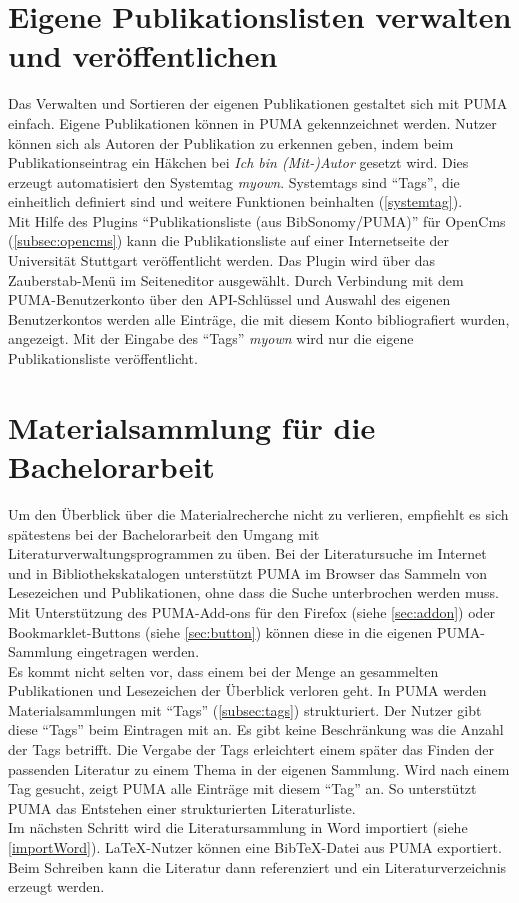 \section{Eigene Publikationslisten verwalten und veröffentlichen}
\label{sec:eigenePublistenVerwalten}
Das Verwalten und Sortieren der eigenen Publikationen gestaltet sich mit PUMA einfach. Eigene  Publikationen können in PUMA gekennzeichnet werden. Nutzer können sich als Autoren der Publikation zu erkennen geben, indem beim Publikationseintrag ein Häkchen bei \textit{Ich bin (Mit-)Autor} gesetzt wird. Dies erzeugt automatisiert den Systemtag \textit{myown}. Systemtags sind \enquote{Tags}, die einheitlich definiert sind und weitere Funktionen beinhalten (\autoref{systemtag}).\\
Mit Hilfe des Plugins \enquote{Publikationsliste (aus BibSonomy/PUMA)} für OpenCms (\autoref{subsec:opencms}) kann die Publikationsliste auf einer Internetseite der Universität Stuttgart veröffentlicht werden. Das Plugin wird über das Zauberstab-Menü im Seiteneditor ausgewählt. Durch Verbindung mit dem PUMA-Benutzerkonto über den API-Schlüssel und Auswahl des eigenen Benutzerkontos werden alle Einträge, die mit diesem Konto bibliografiert wurden, angezeigt. Mit der Eingabe des \enquote{Tags} \textit{myown} wird nur die eigene Publikationsliste veröffentlicht.



\section{Materialsammlung für die Bachelorarbeit}
\label{sec:materialsammlungBachelorarbeit}
Um den Überblick über die Materialrecherche nicht zu verlieren, empfiehlt es sich spätestens bei der Bachelorarbeit den Umgang mit Literaturverwaltungsprogrammen zu üben. Bei der Literatursuche im Internet und in Bibliothekskatalogen unterstützt PUMA im Browser das Sammeln von Lesezeichen und Publikationen, ohne dass die Suche unterbrochen werden muss. Mit Unterstützung des PUMA-Add-ons für den Firefox (siehe \autoref{sec:addon}) oder Bookmarklet-Buttons (siehe \autoref{sec:button}) können diese in die eigenen PUMA-Sammlung eingetragen werden.\\
Es kommt nicht selten vor, dass einem bei der Menge an gesammelten Publikationen und Lesezeichen der Überblick verloren geht. In PUMA werden Materialsammlungen mit \enquote{Tags} (\autoref{subsec:tags}) strukturiert. Der Nutzer gibt diese \enquote{Tags} beim Eintragen mit an. Es gibt keine Beschränkung was die Anzahl der Tags betrifft. Die Vergabe der Tags erleichtert einem später das Finden der passenden Literatur zu einem Thema in der eigenen Sammlung. Wird nach einem Tag gesucht, zeigt PUMA alle Einträge mit diesem \enquote{Tag} an. So unterstützt PUMA das Entstehen einer strukturierten Literaturliste.\\
Im nächsten Schritt wird die Literatursammlung in Word importiert (siehe \autoref{importWord}). LaTeX-Nutzer können eine BibTeX-Datei aus PUMA exportiert. Beim Schreiben kann die Literatur dann referenziert und ein Literaturverzeichnis erzeugt werden.
